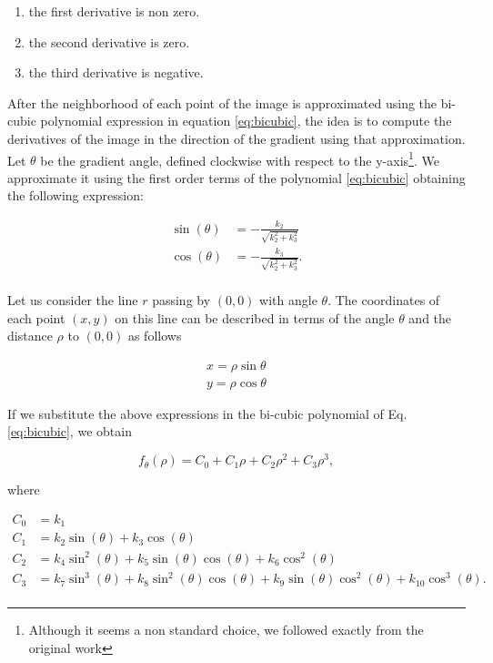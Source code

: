 \documentclass{ipol}
\numberwithin{equation}{section}
\numberwithin{table}{section}
\begin{document}
\begin{enumerate}
\item the first derivative is non zero.
\item the second derivative is zero.
\item the third derivative is negative.
\end{enumerate}

After the neighborhood of each point of the image is approximated using the bi-cubic polynomial expression in equation \ref{eq:bicubic}, the idea is to compute the derivatives of the image in the direction of the gradient using that approximation.\\

Let $\theta$ be the gradient angle, defined clockwise with respect to the y-axis\footnote{Although it seems a non standard choice, we followed exactly from the original work}. We approximate it using the first order terms of the polynomial \ref{eq:bicubic} obtaining the following expression:

\begin{align}
\label{eq:sincos}
	\sin(\theta) & = -\frac{k_2}{\sqrt{k_2^2 + k_3^2}} \nonumber \\
	\cos(\theta) & = -\frac{k_3}{\sqrt{k_2^2 + k_3^2}}. \\
\end{align}

Let us consider the line $r$ passing by $(0,0)$ with angle $\theta$. The coordinates of each point $(x,y)$ on this line can be described in terms of  the angle $\theta$ and the distance $\rho$ to $(0,0)$ as follows

\begin{align*}
	x = \rho\sin{\theta} \\
	y = \rho\cos{\theta} 
\end{align*}

If we substitute the above expressions in the bi-cubic polynomial of Eq. \ref{eq:bicubic}, we obtain

\begin{equation}
	f_{\theta}(\rho) = C_0 + C_1\rho + C_2\rho^2 + C_3\rho^3 ,
\end{equation}

where

\begin{align}
\label{eq:c}
	C_0 & = k_1 \nonumber \nonumber \\
	C_1 & = k_2\sin(\theta) + k_3\cos(\theta) \nonumber \\
	C_2 & = k_4\sin^2(\theta) + k_5\sin(\theta)\cos(\theta) + k_6\cos^2(\theta) \nonumber \\
	C_3 & = k_7\sin^3(\theta) + k_8\sin^2(\theta)\cos(\theta) + k_9\sin(\theta)\cos^2(\theta) + k_{10}\cos^3(\theta). \nonumber \\
\end{align}
\end{document}

